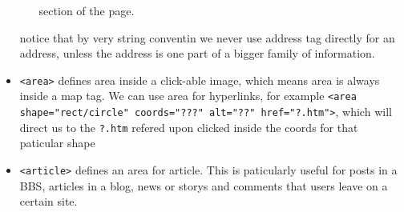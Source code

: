 \documentclass[oneside, 12pt]{article}
\newcommand{\itemm}[1]{\item \texttt{#1}}
\begin{document}
\begin{itemize}
\begin{enumerate}
			section of the page.
		\end{enumerate}
		notice that by very string conventin we never use address tag directly for an address, unless 
		the address is one part of a bigger family of information.
	\itemm{<area>} defines area inside a click-able image, which means area is always inside a map tag.
	We can use area for hyperlinks, for example \texttt{<area shape="rect/circle" coords="???" alt="??" href="?.htm">}, 
	which will direct us to the \texttt{?.htm} refered upon clicked inside the coords for that paticular shape
	\itemm{<article>} defines an area for article. This is paticularly useful for posts in a BBS, articles
	in a blog, news or storys and comments that users leave on a certain site.

\end{itemize}
\end{document}
